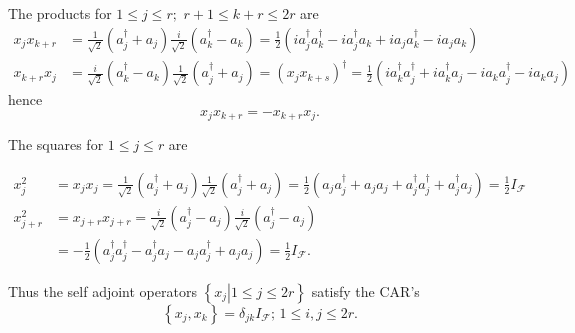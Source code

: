 \documentclass[aps, preprint]{revtex4}
\begin{document}
The products for $1 \leq j \leq r ;$ $r +1 \leq k +r \leq 2 r$ are
\begin{align}x_{j} x_{k +r} &  =\frac{1}{\sqrt{2}} \left (a_{j}^{ \dag } +a_{j}\right ) \frac{i}{\sqrt{2}} \left (a_{k}^{ \dag } -a_{k}\right ) =\frac{1}{2} \left (i a_{j}^{ \dag } a_{k}^{ \dag } -i a_{j}^{ \dag } a_{k} +i a_{j} a_{k}^{ \dag } -i a_{j} a_{k}\right ) \nonumber  \\
x_{k +r} x_{j} &  =\frac{i}{\sqrt{2}} \left (a_{k}^{ \dag } -a_{k}\right ) \frac{1}{\sqrt{2}} \left (a_{j}^{ \dag } +a_{j}\right ) =\left (x_{j} x_{k +s}\right )^{ \dag } =\frac{1}{2} \left (i a_{k}^{ \dag } a_{j}^{ \dag } +i a_{k}^{ \dag } a_{j} -i a_{k} a_{j}^{ \dag } -i a_{k} a_{j}\right )\end{align}hence
\begin{equation}x_{j} x_{k +r} = -x_{k +r} x_{j}\text{.}
\end{equation}

The squares for $1 \leq j \leq r$ are 


\begin{align}x_{j}^{2} &  =x_{j} x_{j} =\frac{1}{\sqrt{2}} \left (a_{j}^{ \dag } +a_{j}\right ) \frac{1}{\sqrt{2}} \left (a_{j}^{ \dag } +a_{j}\right ) =\frac{1}{2} \left (a_{j} a_{j}^{ \dag } +a_{j} a_{j} +a_{j}^{ \dag } a_{j}^{ \dag } +a_{j}^{ \dag } a_{j}\right ) =\frac{1}{2} I_{\mathcal{F}} \nonumber  \\
x_{j +r}^{2} &  =x_{j +r} x_{j +r} =\frac{i}{\sqrt{2}} \left (a_{j}^{ \dag } -a_{j}\right ) \frac{i}{\sqrt{2}} \left (a_{j}^{ \dag } -a_{j}\right ) \nonumber  \\
 &  = -\frac{1}{2} \left (a_{j}^{ \dag } a_{j}^{ \dag } -a_{j}^{ \dag } a_{j} -a_{j} a_{j}^{ \dag } +a_{j} a_{j}\right ) =\frac{1}{2} I_{\mathcal{F}}\text{.}\end{align}

Thus the self adjoint operators $\left \{\left .x_{j}\right \vert 1 \leq j \leq 2 r\right \}$ satisfy the CAR's
\begin{equation}\left \{x_{j} ,x_{k}\right \} =\delta _{j k} I_{\mathcal{F}} ;\,1 \leq i ,j \leq 2 r\text{.}
\end{equation}
\end{document}
